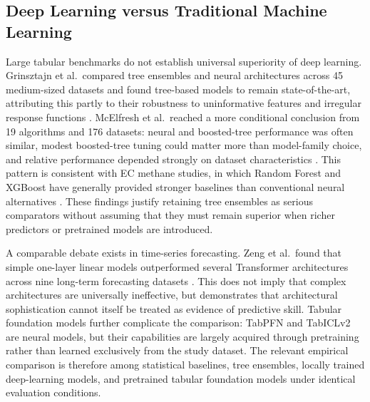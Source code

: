 
\subsection{Deep Learning versus Traditional Machine Learning}

Large tabular benchmarks do not establish universal superiority of deep
learning. Grinsztajn et al.\ compared tree ensembles and neural architectures
across 45 medium-sized datasets and found tree-based models to remain
state-of-the-art, attributing this partly to their robustness to uninformative
features and irregular response functions \cite{grinsztajn2022}. McElfresh
et al.\ reached a more conditional conclusion from 19 algorithms and 176
datasets: neural and boosted-tree performance was often similar, modest
boosted-tree tuning could matter more than model-family choice, and relative
performance depended strongly on dataset characteristics
\cite{mcelfresh2023}. This pattern is consistent with EC methane studies, in
which Random Forest and XGBoost have generally provided stronger baselines than
conventional neural alternatives \cite{irvin2021,kim2020,zhu2023a}. These
findings justify retaining tree ensembles as serious comparators without
assuming that they must remain superior when richer predictors or pretrained
models are introduced.

A comparable debate exists in time-series forecasting. Zeng et al.\ found that
simple one-layer linear models outperformed several Transformer architectures
across nine long-term forecasting datasets \cite{zeng2023}. This does not imply
that complex architectures are universally ineffective, but demonstrates that
architectural sophistication cannot itself be treated as evidence of predictive
skill. Tabular foundation models further complicate the comparison: TabPFN and
TabICLv2 are neural models, but their capabilities are largely acquired through
pretraining rather than learned exclusively from the study dataset. The
relevant empirical comparison is therefore among statistical baselines, tree
ensembles, locally trained deep-learning models, and pretrained tabular
foundation models under identical evaluation conditions.

